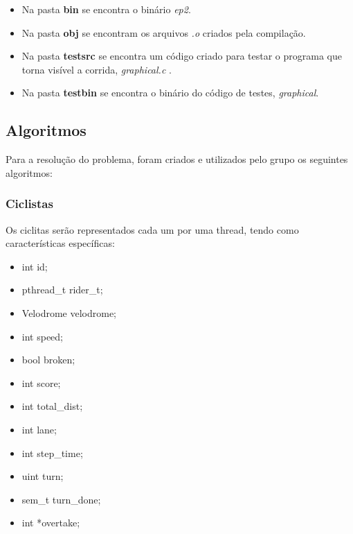 \documentclass[12pt,a4paper]{article}
\begin{document}
\begin{itemize}
    \item Na pasta \textbf{bin} se encontra o binário \textit{ep2}.
    
    \item Na pasta \textbf{obj} se encontram os arquivos \textit{.o} criados pela compilação.
    
    \item Na pasta \textbf{testsrc} se encontra um código criado para testar o programa que torna visível a corrida, \textit{graphical.c} .

    \item Na pasta \textbf{testbin} se encontra o binário do código de testes, \textit{graphical}.
    
    \end{itemize} %

\subsection{Algoritmos}

    Para a resolução do problema, foram criados e utilizados pelo grupo os seguintes algoritmos:
    
\subsubsection{Ciclistas}

    Os ciclitas serão representados cada um por uma thread, tendo como características específicas:
    
    \begin{itemize}
    \item int id;
    \item {pthread\_t rider\_t};
    \item Velodrome velodrome;
    \item int speed;
    \item bool broken;
    \item int score;
    \item int {total\_dist};
    \item int lane;
    \item int {step\_time};
    \item uint turn;
    \item {sem\_t turn\_done};
    \item int *overtake;
    \end{itemize}
\end{document}
